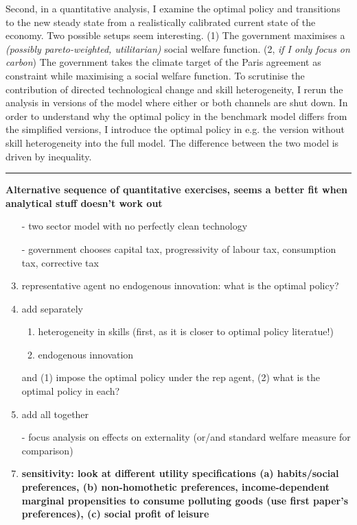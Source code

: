 \documentclass[12pt]{article}
\begin{document}
Second, in a quantitative analysis, I examine the optimal policy and transitions to the new steady state from a realistically calibrated current state of the economy. Two possible setups seem interesting. (1) The government maximises a \textit{(possibly pareto-weighted, utilitarian)} social welfare function. (2, \textit{if I only focus on carbon}) The government takes the climate target of the Paris agreement as constraint while maximising a social welfare function.  
To scrutinise the contribution of directed technological change and skill heterogeneity, I rerun the analysis in versions of the model where either or both channels are shut down. In order to understand why the optimal policy in the benchmark model differs from the simplified versions, I introduce the optimal policy in e.g. the version without skill heterogeneity into the full model. The difference between the two model is driven by inequality. 
\\

\noindent\rule[1ex]{\textwidth}{1pt}
\noindent \textbf{Alternative sequence of quantitative exercises, seems a better fit when analytical stuff doesn't work out}
\begin{enumerate}
	\item[-] two sector model with no perfectly clean technology
	\item[-] government chooses capital tax, progressivity of labour tax, consumption tax, corrective tax
	\item representative agent no endogenous innovation: what is the optimal policy?
	\item add separately 
	\begin{enumerate}
		\item heterogeneity in skills (first, as it is closer to optimal policy literatue!)
		\item endogenous innovation
	\end{enumerate}
and (1) impose the optimal policy under the rep agent, (2) what is the optimal policy in each?
\item add all together
\item[-] focus analysis on effects on externality (or/and standard welfare measure for comparison)
\item \textbf{sensitivity: look at different utility specifications (a) habits/social preferences, (b) non-homothetic preferences, income-dependent marginal propensities to consume polluting goods (use first paper's preferences), (c) social profit of leisure}
\end{enumerate}
\end{document}

